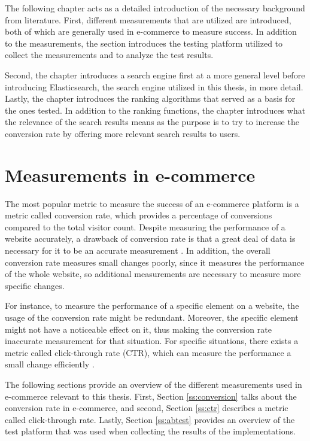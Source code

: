 

The following chapter acts as a detailed introduction of the necessary background from literature.
First, different measurements that are utilized are introduced, 
both of which are generally used in e-commerce to measure success.
In addition to the measurements, the section introduces the testing platform utilized to collect the measurements
and to analyze the test results.

Second, the chapter introduces a search engine first at a more general level before introducing
Elasticsearch, the search engine utilized in this thesis, in more detail.
Lastly, the chapter introduces the ranking algorithms that served as a basis for the ones tested.
In addition to the ranking functions, the chapter introduces what the relevance of the search results means
as the purpose is to try to increase the conversion rate by offering more relevant search results to users.



\section{Measurements in e-commerce}
\label{sec:measurements}

The most popular metric to measure the success of an e-commerce platform 
is a metric called conversion rate,
which provides a percentage of conversions compared to the total visitor count.
Despite measuring the performance of a website accurately, 
a drawback of conversion rate is that a great deal of data is necessary for it to be an accurate measurement 
\cite{conversionRateWhat}.
In addition, the overall conversion rate measures small changes poorly, 
since it measures the performance of the whole website, so
additional measurements are necessary to measure more specific changes.


For instance, to measure the performance of a specific element on a website, 
the usage of the conversion rate might be redundant. 
Moreover, the specific element might not have a noticeable effect on it, 
thus making the conversion rate inaccurate measurement for that situation.
For specific situations, there exists a metric called click-through rate (CTR), 
which can measure the performance a small change efficiently \cite{ctrWhat}.


The following sections provide an overview of the different measurements used in e-commerce relevant to this thesis.
First, Section \ref{ss:conversion} talks about the conversion rate in e-commerce, and second, 
Section \ref{ss:ctr} describes a metric called click-through rate.
Lastly, Section \ref{ss:abtest} provides an overview of the test platform that was used
when collecting the results of the implementations.


